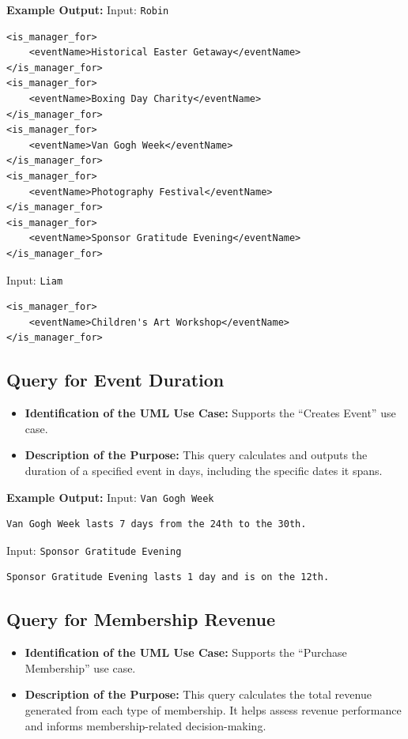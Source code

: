 \documentclass{article} %
\begin{document}
\textbf{Example Output:}  
Input: \texttt{Robin}
\begin{verbatim}
<is_manager_for>
    <eventName>Historical Easter Getaway</eventName>
</is_manager_for>
<is_manager_for>
    <eventName>Boxing Day Charity</eventName>
</is_manager_for>
<is_manager_for>
    <eventName>Van Gogh Week</eventName>
</is_manager_for>
<is_manager_for>
    <eventName>Photography Festival</eventName>
</is_manager_for>
<is_manager_for>
    <eventName>Sponsor Gratitude Evening</eventName>
</is_manager_for>
\end{verbatim}

Input: \texttt{Liam}
\begin{verbatim}
<is_manager_for>
    <eventName>Children's Art Workshop</eventName>
</is_manager_for>
\end{verbatim}

\subsection{Query for Event Duration}
\begin{itemize}
    \item \textbf{Identification of the UML Use Case:} Supports the ``Creates Event'' use case.
    \item \textbf{Description of the Purpose:} This query calculates and outputs the duration of a specified event in days, including the specific dates it spans.
\end{itemize}

\textbf{Example Output:}  
Input: \texttt{Van Gogh Week}  
\begin{verbatim}
Van Gogh Week lasts 7 days from the 24th to the 30th.
\end{verbatim}

Input: \texttt{Sponsor Gratitude Evening}  
\begin{verbatim}
Sponsor Gratitude Evening lasts 1 day and is on the 12th.
\end{verbatim}

\subsection{Query for Membership Revenue}
\begin{itemize}
    \item \textbf{Identification of the UML Use Case:} Supports the ``Purchase Membership'' use case.
    \item \textbf{Description of the Purpose:} This query calculates the total revenue generated from each type of membership. It helps assess revenue performance and informs membership-related decision-making.
\end{itemize}
\end{document}
